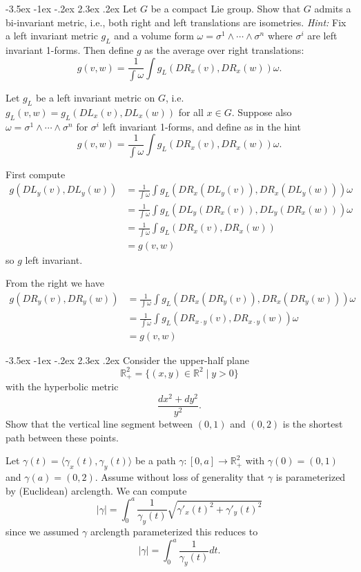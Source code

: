 \documentclass[10pt]{article}
\makeatletter
\renewcommand\section{\@startsection{section}{1}{\z@}%
                                  {-3.5ex \@plus -1ex \@minus -.2ex}%
                                  {2.3ex \@plus.2ex}%
                                  {\normalfont\large\bfseries}}
\newcommand{\R}{{\ensuremath{\mathbb{R}}} }
\newcommand{\hint}[1]{{\emph{Hint:} #1}} %
\makeatother
\begin{document}

\section{Let $G$ be a compact Lie group. Show that $G$ admits a bi-invariant metric, i.e., both right and left translations are isometries. \hint{Fix a left invariant metric $g_L$ and a volume form $\omega = \sigma^1 \wedge \cdots \wedge \sigma^n$ where $\sigma^i$ are left invariant 1-forms. Then define $g$ as the average over right translations: $$g(v,w) = \frac{1}{\int \omega} \int g_L (DR_x (v) , DR_x(w)) \omega.$$}}

Let $g_L$ be a left invariant metric on $G$, i.e. $g_L(v,w) = g_L(DL_x (v) , DL_x(w) ) $ for all $x \in G$. Suppose also $ \omega = \sigma^1 \wedge \cdots \wedge \sigma^n$ for  $\sigma^i$   left invariant 1-forms, and define as in the hint
\[g(v,w) = \frac{1}{\int \omega} \int g_L (DR_x (v) , DR_x(w)) \omega.\]

First compute
\begin{align*}g( DL_y(v),DL_y(w)) &= \frac{1}{\int \omega} \int g_L (DR_x (DL_y(v)) , DR_x(DL_y(w))) \omega \\ &= \frac{1}{\int \omega} \int g_L (DL_y(DR_x (v)) , DL_y(DR_x(w))) \omega\\ &= \frac{1}{\int \omega} \int g_L ( DR_x (v) ,DR_x(w)) \\&= g(v,w) \end{align*}
so $g$ left invariant.

From the right we have
\begin{align*}g( DR_y(v),DR_y(w)) &= \frac{1}{\int \omega} \int g_L (DR_x (DR_y(v)) , DR_x(DR_y(w))) \omega \\ &= \frac{1}{\int \omega} \int g_L (DR_{x \cdot y}(v) , DR_{x\cdot y}(w)) \omega\\ &= g(v,w)  \end{align*}


\section{Consider the upper-half plane $$\R^2_+  = \{ (x,y) \in \R^2 \mid y > 0 \}$$ with the hyperbolic metric $$\frac{dx^2 + dy^2}{y^2}.$$ Show that  the vertical line segment between $(0,1)$ and $(0,2)$ is the shortest path between these points.}

Let $\gamma(t) = \langle \gamma_x(t), \gamma_y(t) \rangle$ be a path $\gamma:[0,a]\to \R_+^2$ with 
$\gamma(0) = (0,1)$ and $\gamma(a) = (0,2)$. Assume without loss of generality that $\gamma$ is parameterized by 
(Euclidean) arclength. We can compute
\[|\gamma| = \int_0^a  \frac{1}{\gamma_y(t)} \sqrt{ \gamma'_x(t) ^2 + \gamma'_y(t)^2 } \]
since we assumed $\gamma$ arclength parameterized this reduces to
\[|\gamma| = \int_0^a \frac{1}{\gamma_y(t)} dt.\]
\end{document}
